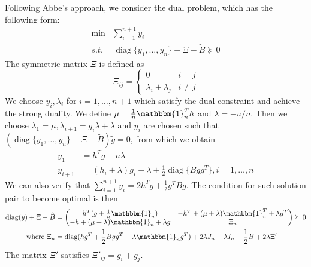 \documentclass{article}
\DeclareMathOperator{\diag}{diag}
\begin{document}
Following Abbe's approach, we consider the dual problem, which has the following form:
\begin{align*}
\min &\sum_{i=1}^{n+1} y_i \\
s.t. &\, \diag\{y_1, \dots, y_n\} + \Xi - \widetilde{B} \succeq 0 
\end{align*}
The symmetric matrix $\Xi$ is defined as 
\begin{equation}
\Xi_{ij} = \begin{cases}
0 & i=j \\
\lambda_i + \lambda_j & i\neq j
\end{cases}
\end{equation}
We choose $y_i, \lambda_i$ for $i=1,\dots, n+1$ which satisfy
the dual constraint and achieve the strong duality.
We define $\mu=\frac{1}{n}\mathbbm{1}_n^T h$ and $\lambda = -u/n$.
Then we choose $\lambda_1=\mu, \lambda_{i+1}=g_i\lambda + \lambda$
and $y_i$ are chosen such that
$(\diag\{y_1, \dots, y_n\} + \Xi - \widetilde{B})\tilde{g}=0$, from which we obtain
\begin{align}
y_1 &= h^T g - n\lambda \\
y_{i+1} & = (h_i +\lambda)g_i + \lambda + \frac{1}{2}\diag\{Bgg^T\}, i = 1, \dots, n
\end{align}
We can also verify that $\sum_{i=1}^{n+1} y_i = 2h^Tg +\frac{1}{2} g^T B g$.
The condition for such solution pair to become optimal is then
\begin{align}
\diag(y) + \Xi - \widetilde{B} & = \begin{pmatrix} h^T (g+\frac{1}{n}\mathbbm{1}_n) & -h^T +(\mu + \lambda)\mathbbm{1}_n^T + \lambda g^T\\
-h+(\mu + \lambda )\mathbbm{1}_n + \lambda g& \Xi_n \end{pmatrix}
\succeq 0 \notag \\
\textrm{ where }\Xi_n & = \diag(hg^T + \frac{1}{2}Bgg^T - \lambda \mathbbm{1}_ng^T)  + 2\lambda J_n -\lambda I_n - \frac{1}{2}B + 2\lambda \Xi'
\end{align}
The matrix $\Xi'$ satisfies $\Xi'_{ij}=g_i + g_j$.
\end{document}
